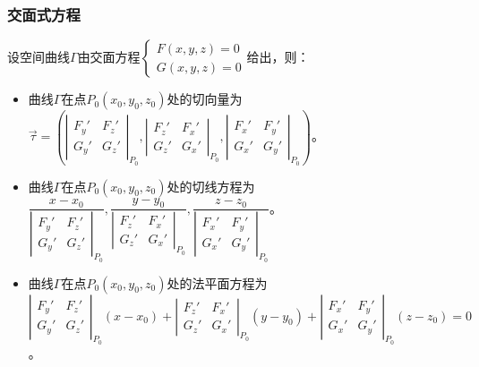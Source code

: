 \documentclass[UTF8, 12pt]{ctexart}
\begin{document}
\subsubsection{交面式方程}

设空间曲线$\varGamma$由交面方程$\left\{\begin{array}{l}
    F(x,y,z)=0 \\
    G(x,y,z)=0
\end{array}\right.$给出，则：

\begin{itemize}
    \item 曲线$\varGamma$在点$P_0(x_0,y_0,z_0)$处的切向量为\\$\vec{\tau}=\left(\left\vert\begin{array}{cc}
        F_y' & F_z' \\
        G_y' & G_z'
    \end{array}\right\vert_{P_0},\left\vert\begin{array}{ll}
        F_z' & F_x' \\
        G_z' & G_x'
    \end{array}\right\vert_{P_0},\left\vert\begin{array}{ll}
        F_x' & F_y' \\
        G_x' & G_y'
    \end{array}\right\vert_{P_0}\right)$。
    \item 曲线$\varGamma$在点$P_0(x_0,y_0,z_0)$处的切线方程为\\$\dfrac{x-x_0}{\left\vert\begin{array}{cc}
        F_y' & F_z' \\
        G_y' & G_z'
    \end{array}\right\vert_{P_0}},\dfrac{y-y_0}{\left\vert\begin{array}{ll}
        F_z' & F_x' \\
        G_z' & G_x'
    \end{array}\right\vert_{P_0}},\dfrac{z-z_0}{\left\vert\begin{array}{ll}
        F_x' & F_y' \\
        G_x' & G_y'
    \end{array}\right\vert_{P_0}}$。
    \item 曲线$\varGamma$在点$P_0(x_0,y_0,z_0)$处的法平面方程为\\$\left\vert\begin{array}{cc}
        F_y' & F_z' \\
        G_y' & G_z'
    \end{array}\right\vert_{P_0}(x-x_0)+\left\vert\begin{array}{ll}
        F_z' & F_x' \\
        G_z' & G_x'
    \end{array}\right\vert_{P_0}(y-y_0)+\left\vert\begin{array}{ll}
        F_x' & F_y' \\
        G_x' & G_y'
    \end{array}\right\vert_{P_0}(z-z_0)=0$。
\end{itemize}
\end{document}
